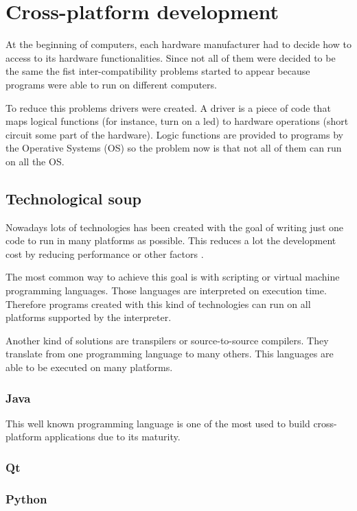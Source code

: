 \chapter{Cross-platform development}

At the beginning of computers, each hardware manufacturer had to decide how to
access to its hardware functionalities. Since not all of them were decided to be
the same the fist inter-compatibility problems started to appear because 
programs were able to run on different computers.

To reduce this problems drivers were created. A driver is a piece of code that 
maps logical functions (for instance, turn on a led) to hardware operations 
(short circuit some part of the hardware). Logic functions are provided to 
programs by the Operative Systems (OS) so the problem now is that not all of 
them can run on all the OS.

\section{Technological soup}

Nowadays lots of technologies has been created with the goal of writing just
one code to run in many platforms as possible. This reduces a lot the
development cost by reducing performance or other factors .

The most common way to achieve this goal is with scripting or virtual machine 
programming languages. Those languages are interpreted on execution time. 
Therefore programs created with this kind of technologies can run on all
platforms supported by the interpreter.

Another kind of solutions are transpilers or source-to-source compilers. They 
translate from one programming language to many others. This languages are
able to be executed on many platforms.

\subsection{Java}

This well known programming language is one of the most used to build
cross-platform applications due to its maturity. 

\subsection{Qt}

\subsection{Python}

